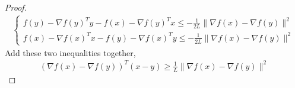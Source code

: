 \documentclass[11pt,a4paper]{article}
\begin{document}
\begin{proof}
\begin{equation}
    \begin{aligned}
        \left\{\begin{matrix}
            f(y)-\nabla f(y)^Ty-f(x)-\nabla f(y)^Tx\leq -\frac{1}{2L}\|\nabla f(x)-\nabla f(y)\|^2\\
            f(x)-\nabla f(x)^Tx-f(y)-\nabla f(x)^Ty\leq -\frac{1}{2L}\|\nabla f(x)-\nabla f(y)\|^2
        \end{matrix}\right.
    \end{aligned}
    \nonumber
\end{equation}
Add these two inequalities together,
\begin{equation}
    \begin{aligned}
        (\nabla f(x)-\nabla f(y))^T(x-y)\geq \frac{1}{L}\|\nabla f(x)-\nabla f(y)\|^2
    \end{aligned}
    \nonumber
\end{equation}
\end{proof}
\end{document}
